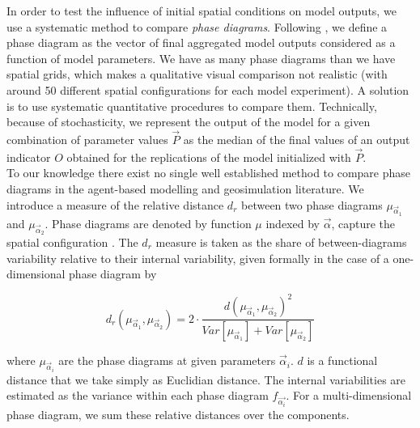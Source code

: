 \documentclass[preprint,5p,times,twocolumn,authoryear]{elsarticle}
\begin{document}
In order to test the influence of initial spatial conditions on model outputs, we use a systematic method to compare \emph{phase diagrams}. Following \citet{Gauvinetal2009}, we define a phase diagram as the vector of final aggregated model outputs considered as a function of model parameters. We have as many phase diagrams than we have spatial grids, which makes a qualitative visual comparison not realistic (with around 50 different spatial configurations for each model experiment). A solution is to use systematic quantitative procedures to compare them.
Technically, because of stochasticity, we represent the output of the model for a given combination of parameter values $\vec{P}$ as the median of the final values of an output indicator $O$ obtained for the replications of the model initialized with $\vec{P}$.\\

To our knowledge there exist no single well established method to compare phase diagrams in the agent-based modelling and geosimulation literature. We introduce a measure of the relative distance $d_r$ between two phase diagrams $\mu_{\vec{\alpha}_1}$ and $\mu_{\vec{\alpha}_2}$. Phase diagrams are denoted by  function $\mu$ indexed by  $\vec{\alpha}$,  capture the spatial configuration . The $d_r$ measure is taken as the share of between-diagrams variability relative to their internal variability, given formally in the case of a one-dimensional phase diagram by


\begin{equation}\label{eq:phase-distance}
d_r\left(\mu_{\vec{\alpha}_1},\mu_{\vec{\alpha}_2}\right) = 2 \cdot \frac{d(\mu_{\vec{\alpha}_1},\mu_{\vec{\alpha}_2})^2}{Var\left[\mu_{\vec{\alpha}_1}\right] + Var\left[\mu_{\vec{\alpha}_2}\right]}
\end{equation}

where $\mu_{\vec{\alpha}_i}$ are the phase diagrams at given  parameters $\vec{\alpha}_i$. $d$ is a functional distance that we take simply as Euclidian distance. The internal variabilities are estimated as the variance within each phase diagram $f_{\vec{\alpha_i}}$. For a multi-dimensional phase diagram, we sum these relative distances over the components. 
\end{document}
